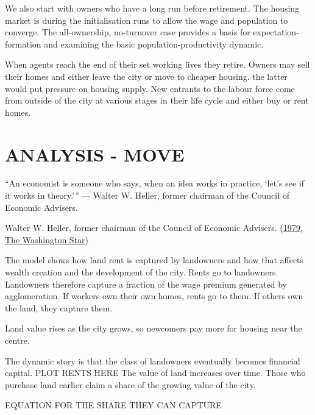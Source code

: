 We also start with owners who have a long run before retirement. The housing market is  during the initialisation runs to allow the wage and population to converge. The all-ownership, no-turnover case provides a basis for expectation-formation and examining the basic population-productivity dynamic. 

When agents reach the end of their set working lives they retire. %
Owners may sell their homes and either leave the city or move to cheaper housing. the latter would put pressure on housing supply. New entrants to the labour force come from outside of the city at various stages in their life cycle and either buy or rent homes. 

\section{ANALYSIS - MOVE}
\epigraph{“An economist is someone who says, when an idea works in practice, ‘let’s see if it works in theory.'”
— Walter W. Heller, former chairman of the Council of Economic Advisers.}{ Walter W. Heller, former chairman of the Council of Economic Advisers. (\href{https://quoteinvestigator.com/2015/08/30/practice/}{1979, The Washington Star)}}


The model shows how land rent is captured by landowners and how that affects wealth creation and the development of the city. 
Rents go to landowners. %
Landowners therefore capture a fraction of the wage premium generated by agglomeration.
If workers own their own homes, rents go to them. If others own the land, they capture them.

Land value rises as the city grows, so newcomers pay more for housing near the centre.

The dynamic story is that the class of landowners eventually becomes financial capital.
PLOT RENTS HERE
The value of land increases over time. Those who purchase land earlier claim a share of the growing value of the city. %
 
EQUATION FOR THE SHARE THEY CAN CAPTURE

